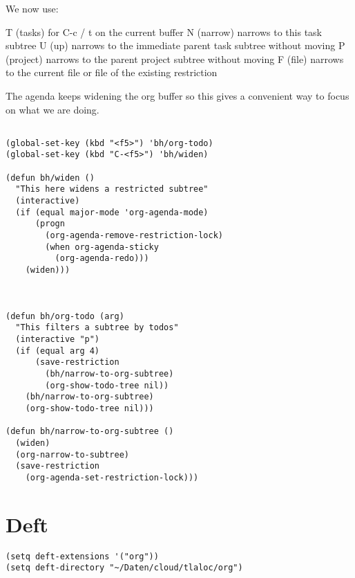 \documentclass[11pt]{article}
\begin{document}
We now use:

T (tasks) for C-c / t on the current buffer
N (narrow) narrows to this task subtree
U (up) narrows to the immediate parent task subtree without moving
P (project) narrows to the parent project subtree without moving
F (file) narrows to the current file or file of the existing restriction

The agenda keeps widening the org buffer so this gives a convenient way to focus on what we are doing.
\begin{verbatim}

(global-set-key (kbd "<f5>") 'bh/org-todo)
(global-set-key (kbd "C-<f5>") 'bh/widen)

(defun bh/widen ()
  "This here widens a restricted subtree"
  (interactive)
  (if (equal major-mode 'org-agenda-mode)
      (progn
        (org-agenda-remove-restriction-lock)
        (when org-agenda-sticky
          (org-agenda-redo)))
    (widen)))



(defun bh/org-todo (arg)
  "This filters a subtree by todos"
  (interactive "p")
  (if (equal arg 4)
      (save-restriction
        (bh/narrow-to-org-subtree)
        (org-show-todo-tree nil))
    (bh/narrow-to-org-subtree)
    (org-show-todo-tree nil)))

(defun bh/narrow-to-org-subtree ()
  (widen)
  (org-narrow-to-subtree)
  (save-restriction
    (org-agenda-set-restriction-lock)))
\end{verbatim}
\section{Deft}
\label{sec:org88821dc}
\begin{verbatim}
(setq deft-extensions '("org"))
(setq deft-directory "~/Daten/cloud/tlaloc/org")
\end{verbatim}
\end{document}
